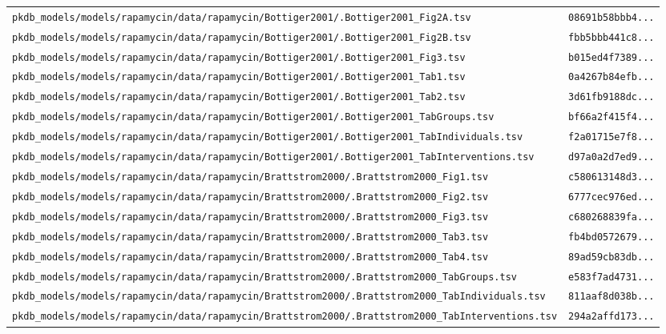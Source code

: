 \begin{longtable}{ll}
\texttt{pkdb\_models/models/rapamycin/data/rapamycin/Bottiger2001/.Bottiger2001\_Fig2A.tsv} & \texttt{08691b58bbb4...} \\
\texttt{pkdb\_models/models/rapamycin/data/rapamycin/Bottiger2001/.Bottiger2001\_Fig2B.tsv} & \texttt{fbb5bbb441c8...} \\
\texttt{pkdb\_models/models/rapamycin/data/rapamycin/Bottiger2001/.Bottiger2001\_Fig3.tsv} & \texttt{b015ed4f7389...} \\
\texttt{pkdb\_models/models/rapamycin/data/rapamycin/Bottiger2001/.Bottiger2001\_Tab1.tsv} & \texttt{0a4267b84efb...} \\
\texttt{pkdb\_models/models/rapamycin/data/rapamycin/Bottiger2001/.Bottiger2001\_Tab2.tsv} & \texttt{3d61fb9188dc...} \\
\texttt{pkdb\_models/models/rapamycin/data/rapamycin/Bottiger2001/.Bottiger2001\_TabGroups.tsv} & \texttt{bf66a2f415f4...} \\
\texttt{pkdb\_models/models/rapamycin/data/rapamycin/Bottiger2001/.Bottiger2001\_TabIndividuals.tsv} & \texttt{f2a01715e7f8...} \\
\texttt{pkdb\_models/models/rapamycin/data/rapamycin/Bottiger2001/.Bottiger2001\_TabInterventions.tsv} & \texttt{d97a0a2d7ed9...} \\
\texttt{pkdb\_models/models/rapamycin/data/rapamycin/Brattstrom2000/.Brattstrom2000\_Fig1.tsv} & \texttt{c580613148d3...} \\
\texttt{pkdb\_models/models/rapamycin/data/rapamycin/Brattstrom2000/.Brattstrom2000\_Fig2.tsv} & \texttt{6777cec976ed...} \\
\texttt{pkdb\_models/models/rapamycin/data/rapamycin/Brattstrom2000/.Brattstrom2000\_Fig3.tsv} & \texttt{c680268839fa...} \\
\texttt{pkdb\_models/models/rapamycin/data/rapamycin/Brattstrom2000/.Brattstrom2000\_Tab3.tsv} & \texttt{fb4bd0572679...} \\
\texttt{pkdb\_models/models/rapamycin/data/rapamycin/Brattstrom2000/.Brattstrom2000\_Tab4.tsv} & \texttt{89ad59cb83db...} \\
\texttt{pkdb\_models/models/rapamycin/data/rapamycin/Brattstrom2000/.Brattstrom2000\_TabGroups.tsv} & \texttt{e583f7ad4731...} \\
\texttt{pkdb\_models/models/rapamycin/data/rapamycin/Brattstrom2000/.Brattstrom2000\_TabIndividuals.tsv} & \texttt{811aaf8d038b...} \\
\texttt{pkdb\_models/models/rapamycin/data/rapamycin/Brattstrom2000/.Brattstrom2000\_TabInterventions.tsv} & \texttt{294a2affd173...} \\

\end{longtable}
